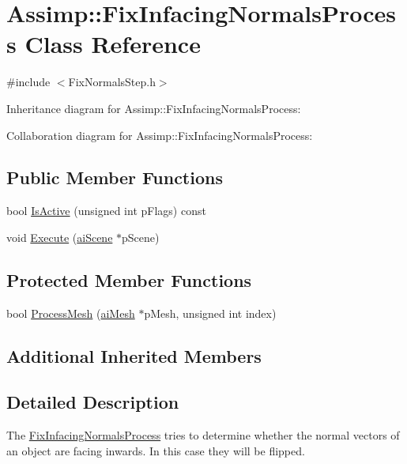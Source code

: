 \hypertarget{class_assimp_1_1_fix_infacing_normals_process}{\section{Assimp\+:\+:Fix\+Infacing\+Normals\+Process Class Reference}
\label{class_assimp_1_1_fix_infacing_normals_process}
}


{\ttfamily \#include $<$Fix\+Normals\+Step.\+h$>$}



Inheritance diagram for Assimp\+:\+:Fix\+Infacing\+Normals\+Process\+:


Collaboration diagram for Assimp\+:\+:Fix\+Infacing\+Normals\+Process\+:
\subsection*{Public Member Functions}
\begin{DoxyCompactItemize}
\item 
bool \hyperlink{class_assimp_1_1_fix_infacing_normals_process_a31727340b175508b2dcb9ca817f5285a}{Is\+Active} (unsigned int p\+Flags) const 
\item 
void \hyperlink{class_assimp_1_1_fix_infacing_normals_process_ad0302db8b379151827d779416a93adc7}{Execute} (\hyperlink{structai_scene}{ai\+Scene} $\ast$p\+Scene)
\end{DoxyCompactItemize}
\subsection*{Protected Member Functions}
\begin{DoxyCompactItemize}
\item 
bool \hyperlink{class_assimp_1_1_fix_infacing_normals_process_a479b4fa281a8fd33d222764d963a33f1}{Process\+Mesh} (\hyperlink{structai_mesh}{ai\+Mesh} $\ast$p\+Mesh, unsigned int index)
\end{DoxyCompactItemize}
\subsection*{Additional Inherited Members}


\subsection{Detailed Description}
The \hyperlink{class_assimp_1_1_fix_infacing_normals_process}{Fix\+Infacing\+Normals\+Process} tries to determine whether the normal vectors of an object are facing inwards. In this case they will be flipped. 

